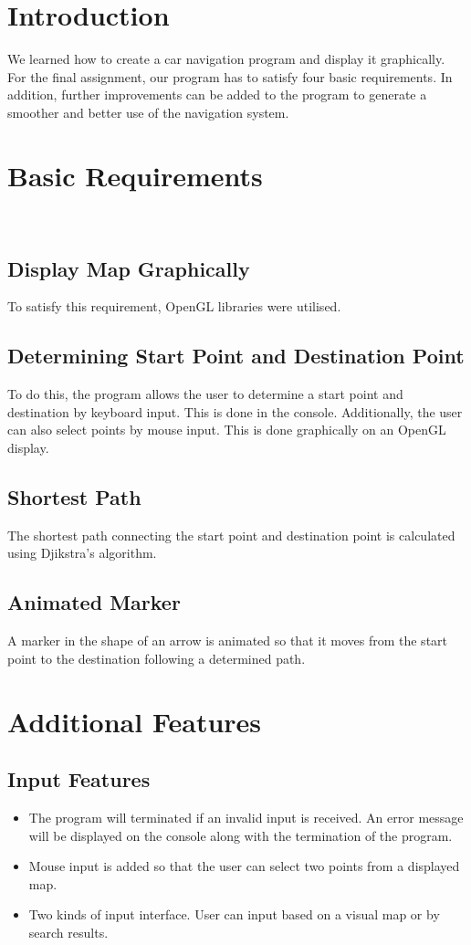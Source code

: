 \documentclass[12pt]{article}
\begin{document}
\maketitle
\newpage

\section{Introduction}
We learned how to create a car navigation program and display it graphically. For the final assignment, our program has to satisfy four basic requirements. In addition, further improvements can be added to the program to generate a smoother and better use of the navigation system.

\section{Basic Requirements}\
\subsection {Display Map Graphically}
To satisfy this requirement, OpenGL libraries were utilised. 
\subsection {Determining Start Point and Destination Point} 
To do this, the program allows the user to determine a start point and destination by keyboard input. This is done in the console. Additionally, the user can also select points by mouse input. This is done graphically on an OpenGL display.
\subsection {Shortest Path}
The shortest path connecting the start point and destination point is calculated using Djikstra's algorithm.
\subsection {Animated Marker}
A marker in the shape of an arrow is animated so that it moves from the start point to the destination following a determined path.
\newpage
\section{Additional Features}
\subsection {Input Features}
\begin{itemize}
	\item The program will terminated if an invalid input is received. An error message will be displayed on the console along with the termination of the program.
	\item Mouse input is added so that the user can select two points from a displayed map.
	\item Two kinds of input interface. User can input based on a visual map or by search results.
\end {itemize}
\end{document}
